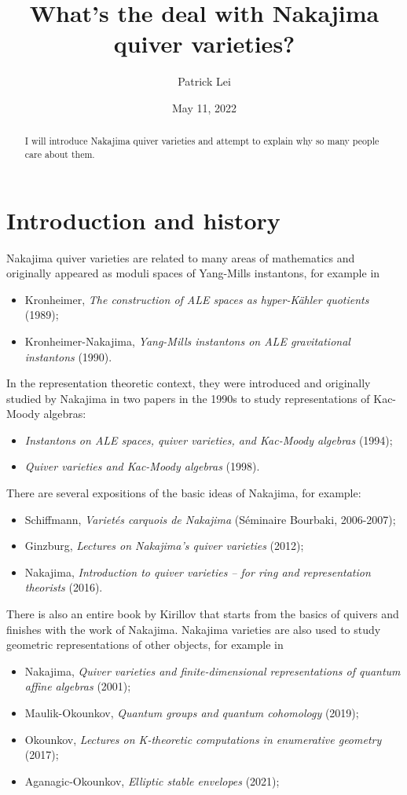 \documentclass{amsart}
\title{What's the deal with Nakajima quiver varieties?}
\author{Patrick Lei}
\date{May 11, 2022}
\theoremstyle{definition}
\theoremstyle{remark}
\theoremstyle{plain}
\theoremstyle{definition}
\theoremstyle{remark}
\newcommand{\1}{\mathbf{1}}
\newcommand{\2}{\mathbf{2}}
\newcommand{\3}{\mathbf{3}}
\begin{document}
    
\maketitle

\begin{abstract}
    I will introduce Nakajima quiver varieties and attempt to explain why so many people care about them.
\end{abstract}

\section{Introduction and history}

Nakajima quiver varieties are related to many areas of mathematics and originally appeared as moduli spaces of Yang-Mills instantons, for example in
\begin{itemize}
    \item Kronheimer, \textit{The construction of ALE spaces as hyper-K\"ahler quotients} (1989);
    \item Kronheimer-Nakajima, \textit{Yang-Mills instantons on ALE gravitational instantons} (1990).
\end{itemize}

In the representation theoretic context, they were introduced and originally studied by Nakajima in two papers in the 1990s to study representations of Kac-Moody algebras:
\begin{itemize}
    \item \textit{Instantons on ALE spaces, quiver varieties, and Kac-Moody algebras} (1994);
    \item \textit{Quiver varieties and Kac-Moody algebras} (1998).
\end{itemize}
There are several expositions of the basic ideas of Nakajima, for example:
\begin{itemize}
    \item Schiffmann, \textit{Variet\'es carquois de Nakajima} (S\'eminaire Bourbaki, 2006-2007);
    \item Ginzburg, \textit{Lectures on Nakajima's quiver varieties} (2012);
    \item Nakajima, \textit{Introduction to quiver varieties -- for ring and representation theorists} (2016).
\end{itemize}
There is also an entire book by Kirillov that starts from the basics of quivers and finishes with the work of Nakajima. Nakajima varieties are also used to study geometric representations of other objects, for example in
\begin{itemize}
    \item Nakajima, \textit{Quiver varieties and finite-dimensional representations of quantum affine algebras} (2001);
    \item Maulik-Okounkov, \textit{Quantum groups and quantum cohomology} (2019);
    \item Okounkov, \textit{Lectures on K-theoretic computations in enumerative geometry} (2017);
    \item Aganagic-Okounkov, \textit{Elliptic stable envelopes} (2021);
\end{itemize}
\end{document}
